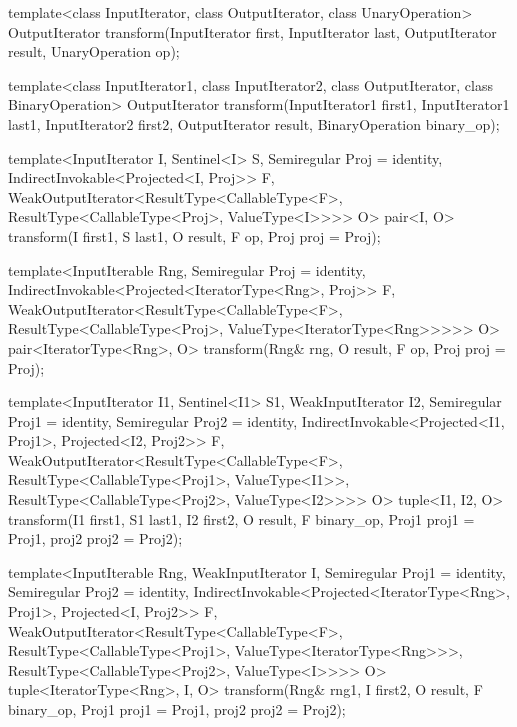 %
\begin{removedblock}
\begin{itemdecl}
template<class InputIterator, class OutputIterator,
         class UnaryOperation>
  OutputIterator
    transform(InputIterator first, InputIterator last,
              OutputIterator result, UnaryOperation op);

template<class InputIterator1, class InputIterator2,
         class OutputIterator, class BinaryOperation>
  OutputIterator
    transform(InputIterator1 first1, InputIterator1 last1,
              InputIterator2 first2, OutputIterator result,
              BinaryOperation binary_op);
\end{itemdecl}
\end{removedblock}
\begin{addedblock}
\begin{itemdecl}
template<InputIterator I, Sentinel<I> S, Semiregular Proj = identity,
    IndirectInvokable<Projected<I, Proj>> F,
    WeakOutputIterator<ResultType<CallableType<F>,
      ResultType<CallableType<Proj>, ValueType<I>>>> O>
  pair<I, O>
  transform(I first1, S last1, O result, F op, Proj proj = Proj{});

template<InputIterable Rng, Semiregular Proj = identity,
    IndirectInvokable<Projected<IteratorType<Rng>, Proj>> F,
    WeakOutputIterator<ResultType<CallableType<F>,
    ResultType<CallableType<Proj>, ValueType<IteratorType<Rng>>>>> O>
  pair<IteratorType<Rng>, O>
    transform(Rng& rng, O result, F op, Proj proj = Proj{});

template<InputIterator I1, Sentinel<I1> S1, WeakInputIterator I2,
  Semiregular Proj1 = identity, Semiregular Proj2 = identity,
    IndirectInvokable<Projected<I1, Proj1>, Projected<I2, Proj2>> F,
    WeakOutputIterator<ResultType<CallableType<F>,
      ResultType<CallableType<Proj1>, ValueType<I1>>,
      ResultType<CallableType<Proj2>, ValueType<I2>>>> O>
tuple<I1, I2, O>
    transform(I1 first1, S1 last1, I2 first2, O result,
              F binary_op, Proj1 proj1 = Proj1{}, proj2 proj2 = Proj2{});

template<InputIterable Rng, WeakInputIterator I,
    Semiregular Proj1 = identity, Semiregular Proj2 = identity,
  IndirectInvokable<Projected<IteratorType<Rng>, Proj1>, Projected<I, Proj2>> F,
    WeakOutputIterator<ResultType<CallableType<F>,
      ResultType<CallableType<Proj1>, ValueType<IteratorType<Rng>>>,
      ResultType<CallableType<Proj2>, ValueType<I>>>> O>
  tuple<IteratorType<Rng>, I, O>
  transform(Rng& rng1, I first2, O result,
            F binary_op, Proj1 proj1 = Proj1{}, proj2 proj2 = Proj2{});


\end{itemdecl}
\end{addedblock}
